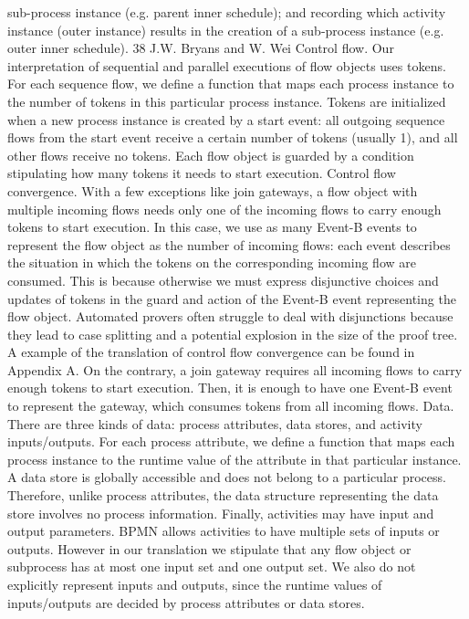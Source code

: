 sub-process instance (e.g. parent inner schedule); and recording which activity instance (outer instance) results in the creation of a sub-process instance
(e.g. outer inner schedule).
38 J.W. Bryans and W. Wei
Control flow. Our interpretation of sequential and parallel executions of flow
objects uses tokens. For each sequence flow, we define a function that maps each
process instance to the number of tokens in this particular process instance.
Tokens are initialized when a new process instance is created by a start event:
all outgoing sequence flows from the start event receive a certain number of
tokens (usually 1), and all other flows receive no tokens. Each flow object is
guarded by a condition stipulating how many tokens it needs to start execution.
Control flow convergence. With a few exceptions like join gateways, a flow object with multiple incoming flows needs only one of the incoming flows to carry
enough tokens to start execution. In this case, we use as many Event-B events
to represent the flow object as the number of incoming flows: each event describes the situation in which the tokens on the corresponding incoming flow are
consumed. This is because otherwise we must express disjunctive choices and
updates of tokens in the guard and action of the Event-B event representing the
flow object. Automated provers often struggle to deal with disjunctions because
they lead to case splitting and a potential explosion in the size of the proof tree.
A example of the translation of control flow convergence can be found in Appendix A. On the contrary, a join gateway requires all incoming flows to carry
enough tokens to start execution. Then, it is enough to have one Event-B event
to represent the gateway, which consumes tokens from all incoming flows.
Data. There are three kinds of data: process attributes, data stores, and activity
inputs/outputs. For each process attribute, we define a function that maps each
process instance to the runtime value of the attribute in that particular instance.
A data store is globally accessible and does not belong to a particular process.
Therefore, unlike process attributes, the data structure representing the data
store involves no process information. Finally, activities may have input and
output parameters. BPMN allows activities to have multiple sets of inputs or
outputs. However in our translation we stipulate that any flow object or subprocess has at most one input set and one output set. We also do not explicitly
represent inputs and outputs, since the runtime values of inputs/outputs are
decided by process attributes or data stores.
